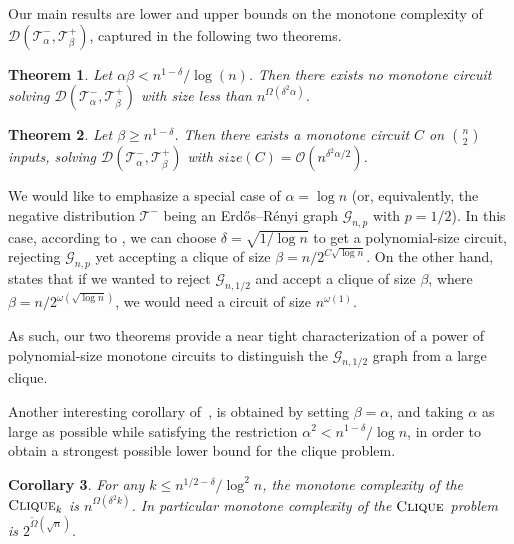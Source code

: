 \documentclass[10pt,a4paper]{article}
\newcommand{\ErdosRenyi}{Erdős–Rényi }
\newtheorem{theorem}{Theorem}[section]
\newtheorem{corollary}[theorem]{Corollary}
\newcommand{\cliquep}{\textsc{Clique}}
\newcommand{\jnote}[1]{\todo[inline,backgroundcolor=blue!20!green]{#1 \\ \textsc{--Jarek}}}
\begin{document}
Our main results are lower and upper bounds on the monotone complexity of $\mathcal{D}(\mathcal{T}^-_\alpha, \mathcal{T}^+_\beta)$, captured in the following two theorems.




\begin{theorem}
\label{thm:main-lb}
    Let $\alpha\beta < n^{1-\delta}/\log(n)$. Then there exists no monotone circuit solving $\mathcal{D}(\mathcal{T}^-_\alpha, \mathcal{T}^+_\beta)$ with size less than $n^{\Omega(\delta^2 \alpha)}$.
\end{theorem}


\begin{theorem}
\label{thm:main-ub}
    Let  $\beta \geq n^{1-\delta}$. Then there exists a monotone circuit $C$ on $\binom{n}{2}$ inputs, solving $\mathcal{D}(\mathcal{T}^-_\alpha, \mathcal{T}^+_\beta)$ with $size(C) = \mathcal{O}(n^{\delta^2\alpha/2})$.
\end{theorem}

We would like to emphasize a special case of $\alpha = \log n$ (or, equivalently, the negative distribution $\mathcal{T}^-$ being an \ErdosRenyi graph $\mathcal{G}_{n,p}$ with $p=1/2$). In this case, according to , we can choose $\delta = \sqrt{1/\log n}$ to get a polynomial-size circuit, rejecting $\mathcal{G}_{n,p}$ yet accepting a clique of size $\beta = n / 2^{C \sqrt{\log n}}$. On the other hand,  states that if we wanted to reject $\mathcal{G}_{n, 1/2}$ and accept a clique of size $\beta$, where $\beta = n / 2^{\omega(\sqrt{\log n})}$, we would need a circuit of size $n^{\omega(1)}$. 

As such, our two theorems provide a near tight characterization of a power of polynomial-size monotone circuits to distinguish the $\mathcal{G}_{n, 1/2}$ graph from a large clique. 

Another interesting corollary of~, is obtained by setting $\beta = \alpha$, and taking $\alpha$ as large as possible while satisfying the restriction $\alpha^2 < n^{1-\delta}/\log n$, in order to obtain a strongest possible lower bound for the clique problem.

\begin{corollary}
    For any $k \leq n^{1/2 - \delta} / \log^2 n$, the monotone complexity of the $\cliquep_k$ is $n^{\Omega(\delta^2 k)}$. In particular monotone complexity of the $\cliquep$ problem is $2^{\tilde{\Omega}(\sqrt{n})}$.
\end{corollary}
\end{document}
